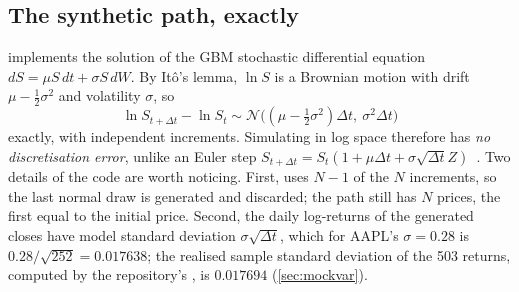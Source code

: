 \subsection{The synthetic path, exactly}
 implements the solution of the GBM stochastic differential equation $dS=\mu S\,dt+\sigma S\,dW$. By
It\^o's lemma, $\ln S$ is a Brownian motion with drift $\mu-\frac12\sigma^2$ and volatility $\sigma$, so
\[ \ln S_{t+\Delta t}-\ln S_t \sim \mathcal N\!\big((\mu-\tfrac12\sigma^2)\Delta t,\ \sigma^2\Delta t\big) \]
exactly, with independent increments. Simulating in log space therefore has \emph{no discretisation error}, unlike an Euler
step $S_{t+\Delta t}=S_t(1+\mu\Delta t+\sigma\sqrt{\Delta t}Z)$~\cite{glasserman2003monte}. Two details of the code are worth
noticing. First,  uses $N-1$ of the $N$ increments, so the
last normal draw is generated and discarded; the path still has $N$ prices, the first equal to the initial price.
Second, the daily log-returns of the generated closes have model standard deviation $\sigma\sqrt{\Delta t}$, which for
AAPL's $\sigma=0.28$ is $0.28/\sqrt{252}=0.017638$; the realised sample standard deviation of the 503 returns,
computed by the repository's , is $0.017694$ (\cref{sec:mockvar}).

